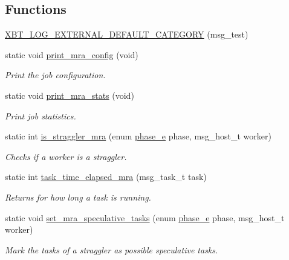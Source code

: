\subsection*{\-Functions}
\begin{DoxyCompactItemize}
\item 
\hyperlink{master-mra_8c_a32bd1bae277b9aa336336310547bb693}{\-X\-B\-T\-\_\-\-L\-O\-G\-\_\-\-E\-X\-T\-E\-R\-N\-A\-L\-\_\-\-D\-E\-F\-A\-U\-L\-T\-\_\-\-C\-A\-T\-E\-G\-O\-R\-Y} (msg\-\_\-test)
\item 
static void \hyperlink{master-mra_8c_a35e18876ff26f7fe749fe4aeba3a7208}{print\-\_\-mra\-\_\-config} (void)
\begin{DoxyCompactList}\small\item\em \-Print the job configuration. \end{DoxyCompactList}\item 
static void \hyperlink{master-mra_8c_ad10e64f15346eb21a4a4b2dab5ab4007}{print\-\_\-mra\-\_\-stats} (void)
\begin{DoxyCompactList}\small\item\em \-Print job statistics. \end{DoxyCompactList}\item 
static int \hyperlink{master-mra_8c_a31c4fbd19a29ede1d95f2b70901f0670}{is\-\_\-straggler\-\_\-mra} (enum \hyperlink{mra_8h_afa14b6e068c0e0b8557777e16f2582f2}{phase\-\_\-e} phase, msg\-\_\-host\-\_\-t worker)
\begin{DoxyCompactList}\small\item\em \-Checks if a worker is a straggler. \end{DoxyCompactList}\item 
static int \hyperlink{master-mra_8c_a307706539b3d6ddd301c250ef7e0990c}{task\-\_\-time\-\_\-elapsed\-\_\-mra} (msg\-\_\-task\-\_\-t task)
\begin{DoxyCompactList}\small\item\em \-Returns for how long a task is running. \end{DoxyCompactList}\item 
static void \hyperlink{master-mra_8c_a769bac1cdfdfc862a1c9dc5444a47c95}{set\-\_\-mra\-\_\-speculative\-\_\-tasks} (enum \hyperlink{mra_8h_afa14b6e068c0e0b8557777e16f2582f2}{phase\-\_\-e} phase, msg\-\_\-host\-\_\-t worker)
\begin{DoxyCompactList}\small\item\em \-Mark the tasks of a straggler as possible speculative tasks. \end{DoxyCompactList}\item 

\end{DoxyCompactItemize}
